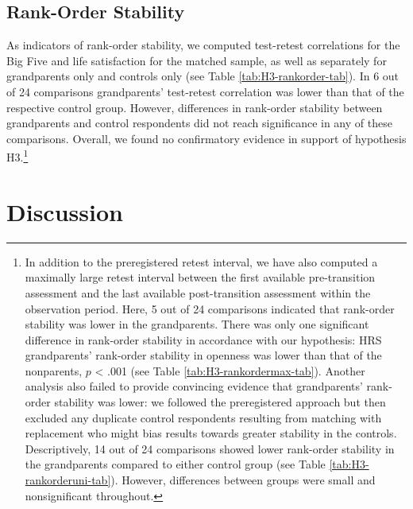 \documentclass[
  english,
  man, noextraspace]{apa7}
\begin{document}
\hypertarget{rank-order-stability}{%
\subsection{Rank-Order Stability}\label{rank-order-stability}}

As indicators of rank-order stability, we computed test-retest correlations for the Big Five and life satisfaction for the matched sample, as well as separately for grandparents only and controls only (see Table \ref{tab:H3-rankorder-tab}). In 6 out of 24 comparisons grandparents' test-retest correlation was lower than that of the respective control group. However, differences in rank-order stability between grandparents and control respondents did not reach significance in any of these comparisons. Overall, we found no confirmatory evidence in support of hypothesis H3.\footnote{In addition to the preregistered retest interval, we have also computed a maximally large retest interval between the first available pre-transition assessment and the last available post-transition assessment within the observation period. Here, 5 out of 24 comparisons indicated that rank-order stability was lower in the grandparents. There was only one significant difference in rank-order stability in accordance with our hypothesis: HRS grandparents' rank-order stability in openness was lower than that of the nonparents, \(p\) \textless{} .001 (see Table \ref{tab:H3-rankordermax-tab}). Another analysis also failed to provide convincing evidence that grandparents' rank-order stability was lower: we followed the preregistered approach but then excluded any duplicate control respondents resulting from matching with replacement who might bias results towards greater stability in the controls. Descriptively, 14 out of 24 comparisons showed lower rank-order stability in the grandparents compared to either control group (see Table \ref{tab:H3-rankorderuni-tab}). However, differences between groups were small and nonsignificant throughout.}

\hypertarget{discussion}{%
\section{Discussion}\label{discussion}}
\end{document}
